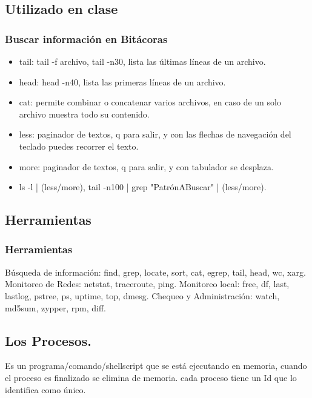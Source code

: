 \documentclass{beamer}
\begin{document}
\subsection{Utilizado en clase}
\begin{frame}
\frametitle{Buscar informaci\'on en Bit\'acoras}
\begin{itemize}
\item \alert{tail}: tail -f archivo, tail -n30, lista las \'ultimas l\'ineas de un archivo.
\item \alert{head}: head -n40, lista las primeras l\'ineas de un archivo.
\item \alert{cat}: permite combinar o concatenar varios archivos, en caso de un solo archivo muestra todo su contenido.
\item \alert{less}: paginador de textos, q para salir, y con las flechas de navegaci\'on del teclado puedes recorrer el texto.
\item \alert{more}: paginador de textos, q para salir, y con tabulador se desplaza.
\\
\item ls -l | (less/more), tail -n100 | grep "Patr\'onABuscar" | (less/more).
\end{itemize}
\end{frame}

\subsection{Herramientas}
\begin{frame}
\frametitle{Herramientas}
B\'usqueda de informaci\'on:  find, grep, locate, sort, cat, egrep, tail, head, wc, xarg.
Monitoreo de Redes: netstat, traceroute, ping.
Monitoreo local: free, df, last, lastlog, pstree, ps, uptime, top, dmesg. 
Chequeo y Administraci\'on: watch, md5sum, zypper, rpm, diff.
\end{frame}

\subsection{Los Procesos.}
\begin{frame}
\begin{definition}
Es un programa/comando/shellscript que se est\'a ejecutando en memoria, cuando el proceso es finalizado se elimina de memoria. cada proceso tiene un Id que lo identifica como \'unico.
\end{definition}
\end{frame}
\end{document}
